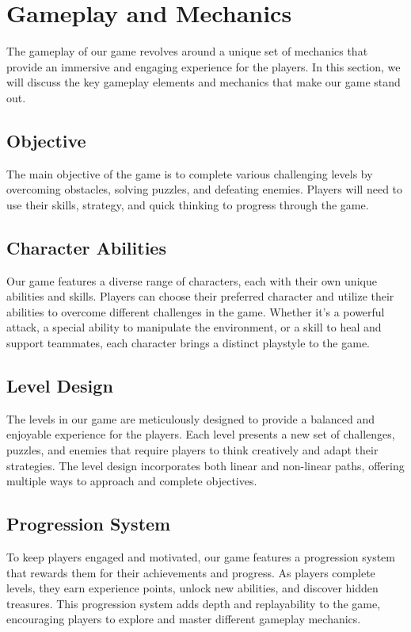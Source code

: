 
\section{Gameplay and Mechanics}

The gameplay of our game revolves around a unique set of mechanics that provide an immersive and engaging experience for the players. In this section, we will discuss the key gameplay elements and mechanics that make our game stand out.

\subsection{Objective}

The main objective of the game is to complete various challenging levels by overcoming obstacles, solving puzzles, and defeating enemies. Players will need to use their skills, strategy, and quick thinking to progress through the game.

\subsection{Character Abilities}

Our game features a diverse range of characters, each with their own unique abilities and skills. Players can choose their preferred character and utilize their abilities to overcome different challenges in the game. Whether it's a powerful attack, a special ability to manipulate the environment, or a skill to heal and support teammates, each character brings a distinct playstyle to the game.

\subsection{Level Design}

The levels in our game are meticulously designed to provide a balanced and enjoyable experience for the players. Each level presents a new set of challenges, puzzles, and enemies that require players to think creatively and adapt their strategies. The level design incorporates both linear and non-linear paths, offering multiple ways to approach and complete objectives.

\subsection{Progression System}

To keep players engaged and motivated, our game features a progression system that rewards them for their achievements and progress. As players complete levels, they earn experience points, unlock new abilities, and discover hidden treasures. This progression system adds depth and replayability to the game, encouraging players to explore and master different gameplay mechanics.

